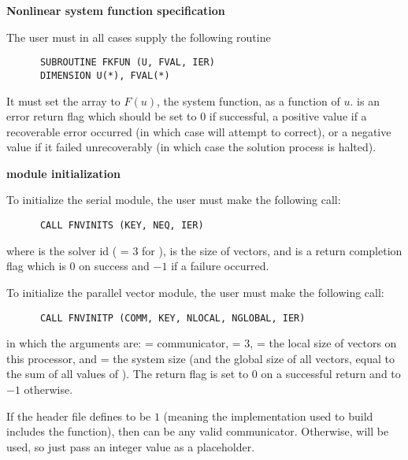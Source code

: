 \begin{Steps}
 
\item {\bf Nonlinear system function specification}
  
  The user must in all cases supply the following {\F} routine
\begin{verbatim}
      SUBROUTINE FKFUN (U, FVAL, IER)
      DIMENSION U(*), FVAL(*)
\end{verbatim}
  It must set the  array to $F(u)$, the system function,
  as a function of  $u$.  
   is an error return flag which should be set to $0$ if successful,
  a positive value if a recoverable error occurred (in which case {\kinsol}
  will attempt to correct), or a negative value if it failed unrecoverably
  (in which case the solution process is halted).

\item  {\bf {\nvector} module initialization}

  {\s} To initialize the serial {\nvector} module, the user must make the
  following call:
\begin{verbatim}
      CALL FNVINITS (KEY, NEQ, IER)
\end{verbatim}
  where 
   is the solver id ( = 3 for {\kinsol}),
   is the size of vectors, and
   is a  return completion flag which is $0$ on success and $-1$ 
  if a failure occurred.
  
  {\p} To initialize the parallel vector module, the user must make the
  following call:
\begin{verbatim}
      CALL FNVINITP (COMM, KEY, NLOCAL, NGLOBAL, IER)
\end{verbatim}
  in which the arguments are:  = {\mpi} communicator,  = 3,
   = the local size of
  vectors on this processor, and  = the system size (and the global
  size of all vectors, equal to the sum of all values of ).
  The return flag  is set to $0$ on a successful return and to $-1$
  otherwise.

  {\warn}If the header file  defines
   to be $1$ (meaning the {\mpi}
  implementation used to build {\sundials} includes the
   function), then  can be any valid
  {\mpi} communicator. Otherwise,  will be used, so
  just pass an integer value as a placeholder.


\end{Steps}
